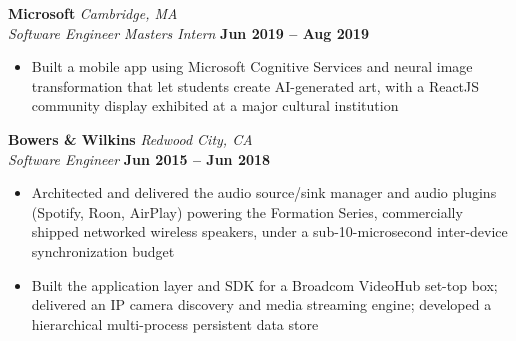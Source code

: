 \documentclass[10pt, letterpaper]{article}
\newcommand{\employer}[2]{%
  \vspace{6pt}\noindent\textbf{\large #1} \hfill \textit{#2} \\[1pt]
}
\newcommand{\role}[2]{%
  \noindent\textit{#1} \hfill \textbf{#2}\vspace{2pt}
}
\begin{document}
\employer{Microsoft}{Cambridge, MA}
\role{Software Engineer Masters Intern}{Jun 2019 -- Aug 2019}
\begin{itemize}
  \item Built a mobile app using Microsoft Cognitive Services and neural image transformation that let students create AI-generated art, with a ReactJS community display exhibited at a major cultural institution
\end{itemize}

\employer{Bowers \& Wilkins}{Redwood City, CA}
\role{Software Engineer}{Jun 2015 -- Jun 2018}
\begin{itemize}
  \item Architected and delivered the audio source/sink manager and audio plugins (Spotify, Roon, AirPlay) powering the Formation Series, commercially shipped networked wireless speakers, under a sub-10-microsecond inter-device synchronization budget
  \item Built the application layer and SDK for a Broadcom VideoHub set-top box; delivered an IP camera discovery and media streaming engine; developed a hierarchical multi-process persistent data store
\end{itemize}
\end{document}
